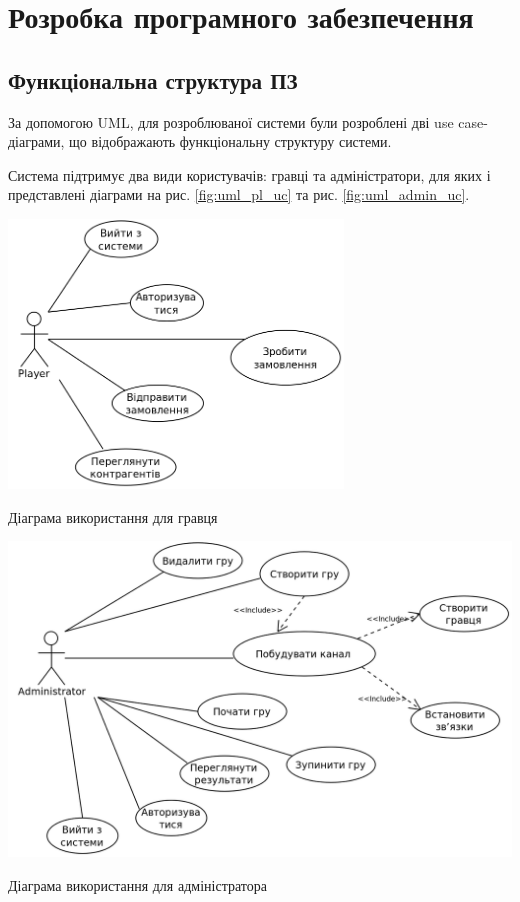 \section{Розробка програмного забезпечення}
\subsection{Функціональна структура ПЗ}
За допомогою UML, для розроблюваної системи були розроблені дві use case-діаграми, що відображають функціональну структуру системи.

Система підтримує два види користувачів: гравці та адміністратори, для яких і представлені діаграми на рис. \ref{fig:uml_pl_uc} та рис. \ref{fig:uml_admin_uc}.
\begin{stdfigure}
    \includegraphics[width=3.5in]{images/uml/player_use_cases.png}
    \caption{Діаграма використання для гравця}
    \label{fig:uml_pl_uc}
\end{stdfigure}   

\begin{stdfigure}
    \includegraphics[width=6in]{images/uml/admin_use_cases.png}
    \caption{Діаграма використання для адміністратора}
    \label{fig:uml_admin_uc}
\end{stdfigure}
